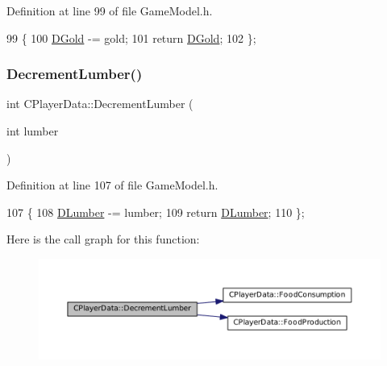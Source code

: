 Definition at line 99 of file Game\+Model.\+h.


\begin{DoxyCode}
99                                    \{
100             \hyperlink{classCPlayerData_afa66ff31262c9b287ae8c13259aae6f3}{DGold} -= gold;
101             \textcolor{keywordflow}{return} \hyperlink{classCPlayerData_afa66ff31262c9b287ae8c13259aae6f3}{DGold};   
102         \};
\end{DoxyCode}
\hypertarget{classCPlayerData_a0c79b0b958333fc52b1de5ec93c01ede}{}\label{classCPlayerData_a0c79b0b958333fc52b1de5ec93c01ede} 
\subsubsection{\texorpdfstring{Decrement\+Lumber()}{DecrementLumber()}}
{\footnotesize\ttfamily int C\+Player\+Data\+::\+Decrement\+Lumber (\begin{DoxyParamCaption}\item[{int}]{lumber }\end{DoxyParamCaption})\hspace{0.3cm}{\ttfamily [inline]}}



Definition at line 107 of file Game\+Model.\+h.


\begin{DoxyCode}
107                                        \{
108             \hyperlink{classCPlayerData_adf3bf2fa49b5c8a4fb9a478d95f688c4}{DLumber} -= lumber;
109             \textcolor{keywordflow}{return} \hyperlink{classCPlayerData_adf3bf2fa49b5c8a4fb9a478d95f688c4}{DLumber};  
110         \};
\end{DoxyCode}
Here is the call graph for this function\+:
\nopagebreak
\begin{figure}[H]
\begin{center}
\leavevmode
\includegraphics[width=350pt]{classCPlayerData_a0c79b0b958333fc52b1de5ec93c01ede_cgraph}
\end{center}
\end{figure}
\hypertarget{classCPlayerData_a24f56e033f6d68ceba0f876d854201f0}{}\label{classCPlayerData_a24f56e033f6d68ceba0f876d854201f0} 
